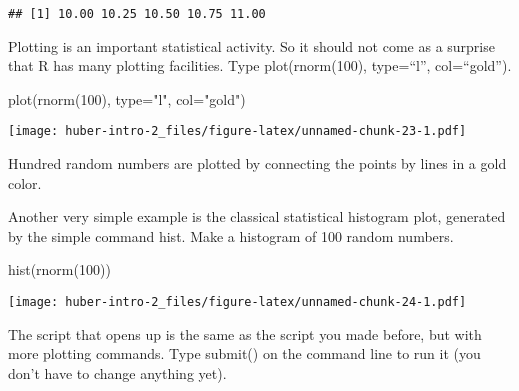 \documentclass[
]{article}
\newenvironment{Shaded}{\begin{snugshade}}{\end{snugshade}}
\newcommand{\AttributeTok}[1]{\textcolor[rgb]{0.77,0.63,0.00}{#1}}
\newcommand{\DecValTok}[1]{\textcolor[rgb]{0.00,0.00,0.81}{#1}}
\newcommand{\FunctionTok}[1]{\textcolor[rgb]{0.00,0.00,0.00}{#1}}
\newcommand{\NormalTok}[1]{#1}
\newcommand{\StringTok}[1]{\textcolor[rgb]{0.31,0.60,0.02}{#1}}
\begin{document}
\begin{verbatim}
## [1] 10.00 10.25 10.50 10.75 11.00
\end{verbatim}

Plotting is an important statistical activity. So it should not come as
a surprise that R has many plotting facilities. Type plot(rnorm(100),
type=``l'', col=``gold'').

\begin{Shaded}
\begin{Highlighting}[]
\FunctionTok{plot}\NormalTok{(}\FunctionTok{rnorm}\NormalTok{(}\DecValTok{100}\NormalTok{), }\AttributeTok{type=}\StringTok{"l"}\NormalTok{, }\AttributeTok{col=}\StringTok{"gold"}\NormalTok{)}
\end{Highlighting}
\end{Shaded}

\texttt{[image: huber-intro-2\_files/figure-latex/unnamed-chunk-23-1.pdf]}

Hundred random numbers are plotted by connecting the points by lines in
a gold color.

Another very simple example is the classical statistical histogram plot,
generated by the simple command hist. Make a histogram of 100 random
numbers.

\begin{Shaded}
\begin{Highlighting}[]
\FunctionTok{hist}\NormalTok{(}\FunctionTok{rnorm}\NormalTok{(}\DecValTok{100}\NormalTok{))}
\end{Highlighting}
\end{Shaded}

\texttt{[image: huber-intro-2\_files/figure-latex/unnamed-chunk-24-1.pdf]}

The script that opens up is the same as the script you made before, but
with more plotting commands. Type submit() on the command line to run it
(you don't have to change anything yet).
\end{document}

